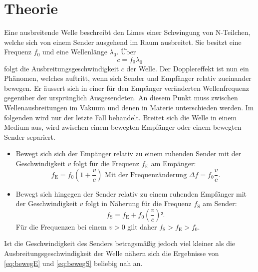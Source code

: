
\section{Theorie}
\label{sec:Theorie}
Eine ausbreitende Welle beschreibt den Limes einer Schwingung von N-Teilchen,
 welche sich von einem Sender ausgehend im Raum ausbreitet. Sie besitzt eine Frequenz $f_0$ und eine Wellenlänge $\lambda_0$. Über
 \begin{equation}
   c = f_0 \lambda_0 \label{eq:c}
   \end{equation}
   folgt die Ausbreitungsgeschwindigkeit $c$ der Welle.
Der Dopplereffekt ist nun ein Phänomen, welches auftritt,
 wenn sich Sender und Empfänger relativ zueinander bewegen. Er äussert sich in
  einer für den Empänger veränderten Wellenfrequenz gegenüber der ursprünglich
   Ausgesendeten. An diesem Punkt muss zwischen Wellenausbreitungen im Vakuum
    und denen in Materie unterschieden werden. Im folgenden wird nur der letzte
     Fall behandelt. Breitet sich die Welle in einem
     Medium aus, wird zwischen einem bewegten Empfänger oder einem bewegten
      Sender separiert.
\begin{itemize}
\item Bewegt sich sich der Empänger relativ zu einem ruhenden Sender mit der
 Geschwindigkeit $v$ folgt für die Frequenz $f_\text{E}$ am Empänger:
 \begin{equation}
   f_\text{E} = f_0\left(1+\frac{v}{c}\right) \text{ Mit der Frequenzänderung }\Delta f = f_0\frac{v}{c}\text{.}\label{eq:bewegE}
   \end{equation}
   \item Bewegt sich hingegen der Sender relativ zu einem ruhenden Empfänger mit der
    Geschwindigkeit $v$ folgt in Näherung für die Frequenz $f_\text{S}$ am Sender:
    \begin{equation}
      f_\text{S} = f_\text{E} + f_0\left(\frac{v}{c}\right)²\text{.}\label{eq:bewegS}
      \end{equation}
      Für die Frequenzen bei einem $v > 0$ gilt daher $f_\text{S} > f_\text{E} > f_0$.
\end{itemize}
Ist die Geschwindigkeit des Senders betragsmäßig jedoch viel kleiner als
 die Ausbreitungsgeschwindigkeit der Welle nähern sich die Ergebnisse von
  \eqref{eq:bewegE} und \eqref{eq:bewegS} beliebig nah an.
